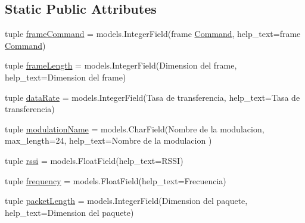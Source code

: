 \subsection*{Static Public Attributes}
\begin{DoxyCompactItemize}
\item 
tuple \hyperlink{class_ground_segment_1_1models_1_1_downlink_frame_1_1_downlink_frame_a74e777653258421b97095109554e348c}{frame\+Command} = models.\+Integer\+Field(\textquotesingle{}frame \hyperlink{class_ground_segment_1_1models_1_1_command_1_1_command_1_1_command}{Command}\textquotesingle{}, help\+\_\+text=\textquotesingle{}frame \hyperlink{class_ground_segment_1_1models_1_1_command_1_1_command_1_1_command}{Command}\textquotesingle{})
\item 
tuple \hyperlink{class_ground_segment_1_1models_1_1_downlink_frame_1_1_downlink_frame_a74dd54f47355823ab4f111408966af69}{frame\+Length} = models.\+Integer\+Field(\textquotesingle{}Dimension del frame\textquotesingle{}, help\+\_\+text=\textquotesingle{}Dimension del frame\textquotesingle{})
\item 
tuple \hyperlink{class_ground_segment_1_1models_1_1_downlink_frame_1_1_downlink_frame_a6f4c1351eae5c62c97a06f6fc251ac0e}{data\+Rate} = models.\+Integer\+Field(\textquotesingle{}Tasa de transferencia\textquotesingle{}, help\+\_\+text=\textquotesingle{}Tasa de transferencia\textquotesingle{})
\item 
tuple \hyperlink{class_ground_segment_1_1models_1_1_downlink_frame_1_1_downlink_frame_a396f8f6467f927c4cb3e1f24d40b4254}{modulation\+Name} = models.\+Char\+Field(\textquotesingle{}Nombre de la modulacion\textquotesingle{}, max\+\_\+length=24, help\+\_\+text=\textquotesingle{}Nombre de la modulacion\textquotesingle{} )
\item 
tuple \hyperlink{class_ground_segment_1_1models_1_1_downlink_frame_1_1_downlink_frame_a2c3915b3ca05d908b523d1bdfc7f73dc}{rssi} = models.\+Float\+Field(help\+\_\+text=\textquotesingle{}R\+S\+S\+I\textquotesingle{})
\item 
tuple \hyperlink{class_ground_segment_1_1models_1_1_downlink_frame_1_1_downlink_frame_a417795733873860a43017936b8bb1f6b}{frequency} = models.\+Float\+Field(help\+\_\+text=\textquotesingle{}Frecuencia\textquotesingle{})
\item 
tuple \hyperlink{class_ground_segment_1_1models_1_1_downlink_frame_1_1_downlink_frame_a01fcc6363ca203c66f9006a7e26cf298}{packet\+Length} = models.\+Integer\+Field(\textquotesingle{}Dimension del paquete\textquotesingle{}, help\+\_\+text=\textquotesingle{}Dimension del paquete\textquotesingle{})

\end{DoxyCompactItemize}
